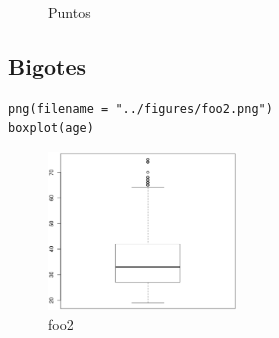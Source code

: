 \begin{figure}[h]
 \begin{center}
 \hspace{0.1cm}
 \hspace{0.1cm}
 \caption{Puntos}
 \label{fig:puntos}
 \end{center}
\end{figure}

\subsection{Bigotes}

\begin{verbatim}
png(filename = "../figures/foo2.png")
boxplot(age)
\end{verbatim}

\begin{figure}[h]
 \centering
 \includegraphics[keepaspectratio,width=5cm]{theimg/foo2}
 \caption[foo2]{foo2}
 \label{fig:bigos}
\end{figure}

